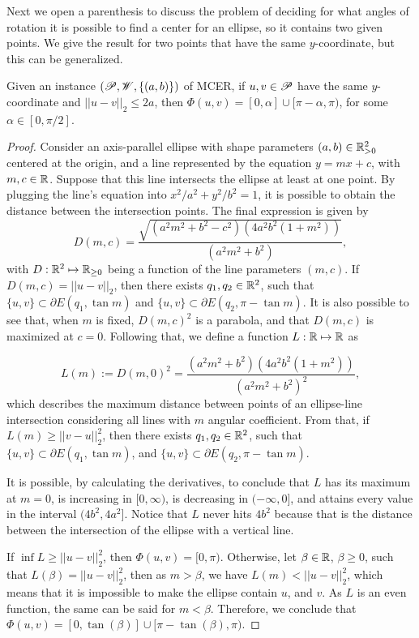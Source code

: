 Next we open a parenthesis to discuss the problem of deciding for what angles of rotation it is possible to find a center for an ellipse, so it contains two given points. We give the result for two points that have the same $y$-coordinate, but this can be generalized.

\begin{lem}\label{lema:l-function}
	Given an instance $(\mathscr{P}, \mathscr{W}, \{(a, b)\})$ of MCER, if $u, v \in \mathscr{P}$ have the same $y$-coordinate and $||u-v||_2 \le 2a$, then $\Phi(u,v) = [0, \alpha] \cup [\pi - \alpha, \pi)$, for some $\alpha \in [0, \pi/2]$.
\end{lem}

\begin{proof}
	
	Consider an axis-parallel ellipse with shape parameters $(a, b)\in\mathbb{R}^2_{>0}$ centered at the origin, and a line represented by the equation $y=mx+c$, with $m, c\in \mathbb{R}$. Suppose that this line intersects the ellipse at least at one point. By plugging the line's equation into $x^2/a^2+y^2/b^2=1$, it is possible to obtain the distance between the intersection points. The final expression is given by
	\begin{equation*}\label{eq:dist_line_ellipse}
	D(m, c)=\dfrac{\sqrt{(a^2m^2+b^2-c^2)(4a^2b^2(1+m^2))}}{(a^2m^2+b^2)},
	\end{equation*}
	with $D : \mathbb{R}^2 \mapsto \mathbb{R}_{\ge0}$ being a function of the line parameters $(m, c)$.
	If $D(m, c) = ||u-v||_2$, then there exists $q_1, q_2 \in \mathbb{R}^2$, such that $\{u, v\} \subset \partial E(q_1, \tan{m})$ and $\{u, v\} \subset \partial E(q_2, \pi-\tan{m})$. It is also possible to see that, when $m$ is fixed, $D(m, c)^2$ is a parabola, and that $D(m, c)$ is maximized at $c=0$.  
	Following that, we define a function $L:\mathbb{R}\mapsto\mathbb{R}$ as
	
	\begin{equation*}
	L(m):= D(m, 0)^2 = \dfrac{(a^2m^2+b^2)(4a^2b^2(1+m^2))}{(a^2m^2+b^2)^2},
	\end{equation*}
	which describes the maximum distance between points of an ellipse-line intersection considering all lines with $m$ angular coefficient. From that, if $L(m) \ge ||v-u||_2^2$, then there exists $q_1, q_2\in\mathbb{R}^2$, such that $\{u, v\} \subset \partial E(q_1, \tan{m})$, and $\{u, v\} \subset \partial E(q_2, \pi-\tan{m})$.
	
	It is possible, by calculating the derivatives, to conclude that $L$ has its maximum at $m=0$, is increasing in $[0, \infty)$, is decreasing in $(-\infty, 0]$, and attains every value in the interval $(4b^2, 4a^2]$. Notice that $L$ never hits $4b^2$ because that is the distance between the intersection of the ellipse with a vertical line.
	
	If $\inf{L} \ge ||u-v||_2^2$, then $\Phi(u,v) = [0, \pi)$.
	Otherwise, let $\beta \in \mathbb{R}$, $\beta \ge 0$, such that $L(\beta) = ||u-v||_2^2$, then as $m>\beta$, we have $L(m) < ||u-v||_2^2$, which means that it is impossible to make the ellipse contain $u$, and $v$.
	As $L$ is an even function, the same can be said for $m < \beta$. Therefore, we conclude that $\Phi(u,v)=[0, \tan(\beta)] \cup [\pi-\tan(\beta), \pi)$.
\end{proof}
